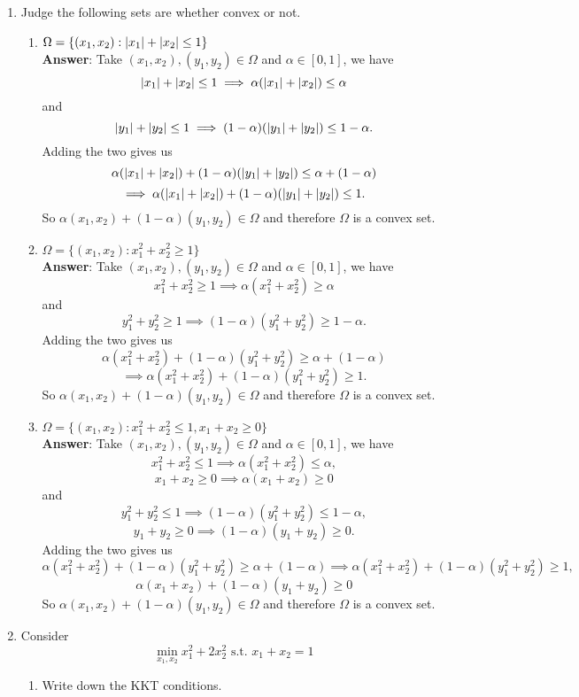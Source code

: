 \documentclass{article}
\begin{document}
\begin{enumerate}
          \newpage
    \item Judge the following sets are whether convex or not.
          \begin{enumerate}
              \item $\Omega=\{(x_1,x_2):\abs{x_1}+\abs{x_2}\leq 1\}$\\
                    \textbf{Answer}: Take $(x_1,x_2),(y_1,y_2)\in\Omega$ and $\alpha\in[0,1]$, we have \[\abs{x_1}+\abs{x_2}\leq 1\implies\alpha(\abs{x_1}+\abs{x_2})\leq\alpha\] and \[\abs{y_1}+\abs{y_2}\leq 1\implies(1-\alpha)(\abs{y_1}+\abs{y_2})\leq 1-\alpha.\] Adding the two gives us \[\alpha(\abs{x_1}+\abs{x_2})+(1-\alpha)(\abs{y_1}+\abs{y_2})\leq\alpha+(1-\alpha)\]\[\implies\alpha(\abs{x_1}+\abs{x_2})+(1-\alpha)(\abs{y_1}+\abs{y_2})\leq 1.\] So $\alpha(x_1,x_2)+(1-\alpha)(y_1,y_2)\in\Omega$ and therefore $\Omega$ is a convex set.
              \item $\Omega=\{(x_1,x_2):x_1^2+x_2^2\geq 1\}$\\
                    \textbf{Answer}: Take $(x_1,x_2),(y_1,y_2)\in\Omega$ and $\alpha\in[0,1]$, we have \[x_1^2+x_2^2\geq 1\implies\alpha(x_1^2+x_2^2)\geq\alpha\] and \[y_1^2+y_2^2\geq 1\implies(1-\alpha)(y_1^2+y_2^2)\geq 1-\alpha.\] Adding the two gives us \[\alpha(x_1^2+x_2^2)+(1-\alpha)(y_1^2+y_2^2)\geq\alpha+(1-\alpha)\]\[\implies\alpha(x_1^2+x_2^2)+(1-\alpha)(y_1^2+y_2^2)\geq 1.\] So $\alpha(x_1,x_2)+(1-\alpha)(y_1,y_2)\in\Omega$ and therefore $\Omega$ is a convex set.
              \item $\Omega=\{(x_1,x_2):x_1^2+x_2^2\leq 1,x_1+x_2\geq 0\}$\\
                    \textbf{Answer}: Take $(x_1,x_2),(y_1,y_2)\in\Omega$ and $\alpha\in[0,1]$, we have \[x_1^2+x_2^2\leq 1\implies\alpha(x_1^2+x_2^2)\leq\alpha,\]\[x_1+x_2\geq 0\implies\alpha(x_1+x_2)\geq 0\] and \[y_1^2+y_2^2\leq 1\implies(1-\alpha)(y_1^2+y_2^2)\leq 1-\alpha,\]\[y_1+y_2\geq 0\implies(1-\alpha)(y_1+y_2)\geq 0.\] Adding the two gives us \[\alpha(x_1^2+x_2^2)+(1-\alpha)(y_1^2+y_2^2)\geq\alpha+(1-\alpha)\implies\alpha(x_1^2+x_2^2)+(1-\alpha)(y_1^2+y_2^2)\geq 1,\]\[\alpha(x_1+x_2)+(1-\alpha)(y_1+y_2)\geq 0\] So $\alpha(x_1,x_2)+(1-\alpha)(y_1,y_2)\in\Omega$ and therefore $\Omega$ is a convex set.
          \end{enumerate}
          \newpage
    \item Consider \[\min_{x_1,x_2}x_1^2+2x_2^2 \text{ s.t. } x_1+x_2=1\]
          \begin{enumerate}
              \item Write down the KKT conditions.\\

\end{enumerate}
\end{enumerate}
\end{document}
